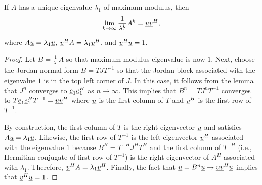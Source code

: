 \begin{theorem}
If $A$ has a unique eigenvalue $\lambda_1$ of maximum modulus, then
\[ \lim_{k\rightarrow \infty} \frac{1}{\lambda_1^k} A^k = \underline{u} \underline{v}^H, \]
where $A \underline{u} = \lambda_1 \underline{u}$, $\underline{v}^H A = \lambda_1 \underline{v}^H$, and $\underline{v}^H \underline{u} = 1$.
\end{theorem}
\begin{proof}
Let $B = \frac{1}{\lambda_1} A$ so that maximum modulus eigenvalue is now $1$.
Next, choose the Jordan normal form $B = T J T^{-1}$ so that the Jordan block associated with the eigenvalue $1$ is in the top left corner of $J$.
In this case, it follows from the lemma that $J^n$ converges to $\underline{e}_1 \underline{e}_1^H$ as $n\rightarrow \infty$.
This implies that $B^n = T J^n T^{-1}$ converges to $T \underline{e}_1 \underline{e}_1^H T^{-1} = \underline{u} \underline{v}^H$ where $\underline{u}$ is the first column of $T$ and $\underline{v}^H$ is the first row of $T^{-1}$.

By construction, the first column of $T$ is the right eigenvector $\underline{u}$ and satisfies $A \underline{u} = \lambda_1 \underline{u}$.
Likewise, the first row of $T^{-1}$ is the left eigenvector $\underline{v}^H$ associated with the eigenvalue $1$ because $B^H = T^{-H} J^H T^H$ and the first column of $T^{-H}$ (i.e., Hermitian conjugate of first row of $T^{-1}$) is the right eigenvector of $A^H$ associated with $\lambda_1$.
Therefore, $\underline{v}^H A = \lambda_1 \underline{v}^H$.
Finally, the fact that $\underline{u} = B^n \underline{u} \rightarrow \underline{u} \underline{v}^H \underline{u}$ implies that $\underline{v}^H \underline{u} = 1$.
\end{proof}




